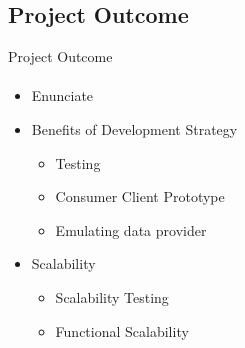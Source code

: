    \subsection{Project Outcome}
    \begin{frame}{Project Outcome}\framesubtitle{}   
        \begin{itemize}
            \item<1-> Enunciate
            \item<2-> Benefits of Development Strategy
            \begin{itemize}
                \item<2-> Testing
                \item<2-> Consumer Client Prototype
                \item<2-> Emulating data provider
            \end{itemize}
            \item<3-> Scalability
            \begin{itemize}
                \item<3-> Scalability Testing
                \item<3-> Functional Scalability
            \end{itemize}

\end{itemize}
\end{frame}
